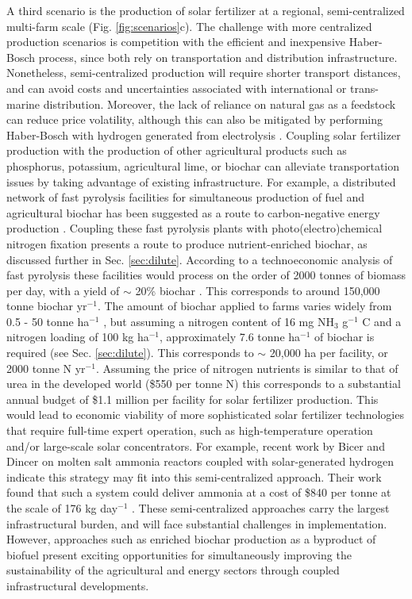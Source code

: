 A third scenario is the production of solar fertilizer at a regional, semi-centralized multi-farm scale (Fig. \ref{fig:scenarios}c). The challenge with more centralized production scenarios is competition with the efficient and inexpensive Haber-Bosch process, since both rely on transportation and distribution infrastructure. Nonetheless, semi-centralized production will require shorter transport distances, and can avoid costs and uncertainties associated with international or trans-marine distribution. Moreover, the lack of reliance on natural gas as a feedstock can reduce price volatility, although this can also be mitigated by performing Haber-Bosch with hydrogen generated from electrolysis \cite{Grundt_1982, Pfromm_2017}. Coupling solar fertilizer production with the production of other agricultural products such as phosphorus, potassium, agricultural lime, or biochar can alleviate transportation issues by taking advantage of existing infrastructure. For example, a distributed network of fast pyrolysis facilities for simultaneous production of fuel and agricultural biochar has been suggested as a route to carbon-negative energy production \cite{Lehmann2007,Lehmann_2007, Glaser2002}. Coupling these fast pyrolysis plants with photo(electro)chemical nitrogen fixation presents a route to produce nutrient-enriched biochar, as discussed further in Sec. \ref{sec:dilute}. According to a technoeconomic analysis of fast pyrolysis these facilities would process on the order of 2000 tonnes of biomass per day, with a yield of $\sim$ 20\% biochar  \cite{Wright_2010}. This corresponds to around 150,000 tonne biochar yr$^{-1}$. The amount of biochar applied to farms varies widely from 0.5 - 50 tonne ha$^{-1}$ \cite{Galinato2011}, but assuming a nitrogen content of 16 mg NH$_3$ g$^{-1}$ C and a nitrogen loading of 100 kg ha$^{-1}$, approximately 7.6 tonne ha$^{-1}$ of biochar is required (see Sec. \ref{sec:dilute}). This corresponds to $\sim$ 20,000 ha per facility, or 2000 tonne N yr$^{-1}$. Assuming the price of nitrogen nutrients is similar to that of urea in the developed world (\$550 per tonne N) this corresponds to a substantial annual budget of \$1.1 million per facility for solar fertilizer production. This would lead to economic viability of more sophisticated solar fertilizer technologies that require full-time expert operation, such as high-temperature operation and/or large-scale solar concentrators. For example, recent work by Bicer and Dincer on molten salt ammonia reactors coupled with solar-generated hydrogen indicate this strategy may fit into this semi-centralized approach. Their work found that such a system could deliver ammonia at a cost of \$840 per tonne at the scale of 176 kg day$^{-1}$ \cite{Bicer_2018,Bicer_2017}. These semi-centralized approaches carry the largest infrastructural burden, and will face substantial challenges in implementation. However, approaches such as enriched biochar production as a byproduct of biofuel present exciting opportunities for simultaneously improving the sustainability of the agricultural and energy sectors through coupled infrastructural developments.

